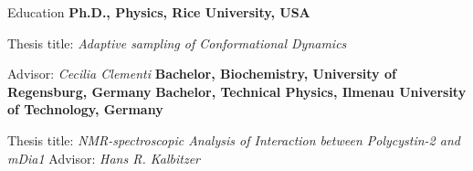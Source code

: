 \begin{rubric}{Education}
%
\entry*[2014 -- 2020]%
	\textbf{Ph.D., Physics, Rice University, USA}
	\par Thesis title: \emph{Adaptive sampling of Conformational Dynamics}
  \par Advisor: \emph{Cecilia Clementi}
%
\entry*[2011 -- 2014]%
	\textbf{Bachelor, Biochemistry, University of Regensburg, Germany} 
%
\entry*[2011 -- 2012]%
  \textbf{Bachelor, Technical Physics, Ilmenau University of Technology, Germany}
  \par Thesis title: \emph{NMR-spectroscopic Analysis of Interaction between Polycystin-2 and mDia1}  Advisor: \emph{Hans R. Kalbitzer}
\end{rubric}
